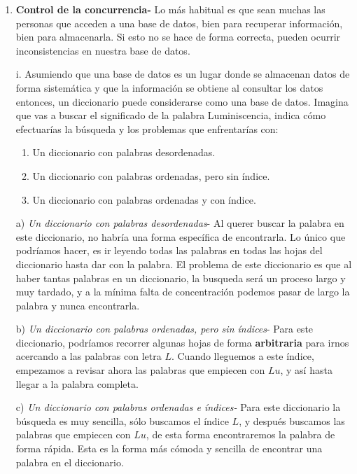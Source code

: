 \documentclass{article}
\begin{document}
\begin{enumerate}
\begin{enumerate}
\item \textbf{Control de la concurrencia- }Lo más habitual es que sean muchas las personas que acceden a una base de datos, bien para recuperar información, bien para almacenarla. Si esto no se hace de forma correcta, pueden ocurrir inconsistencias en nuestra base de datos.
\end{enumerate}    
\begin{itemize}
    \item[i.]Asumiendo que una base de datos es un lugar donde se almacenan datos de forma sistemática y que la información se obtiene al consultar los datos entonces, un diccionario puede considerarse como una base de datos. Imagina que vas a buscar el significado de la palabra Luminiscencia, indica cómo efectuarías la búsqueda y los problemas que enfrentarías con:
    \begin{enumerate}
        \item Un diccionario con palabras desordenadas.
        \item Un diccionario con palabras ordenadas, pero sin índice.
        \item Un diccionario con palabras ordenadas y con índice.
    \end{enumerate}
    \end{itemize}
\begin{itemize}

\item[a)] \textit{Un diccionario con palabras desordenadas}- Al querer buscar la palabra en este diccionario, no habría una forma específica de encontrarla. Lo único que podríamos hacer, es ir leyendo todas las palabras en todas las hojas del diccionario hasta dar con la palabra. El problema de este diccionario es que al haber tantas palabras en un diccionario, la busqueda será un proceso largo y muy tardado, y a la mínima falta de concentración podemos pasar de largo la palabra y nunca encontrarla.\\
\item[b)] \textit{Un diccionario con palabras ordenadas, pero sin índices}- Para este diccionario, podríamos recorrer algunas hojas de forma \textbf{arbitraria} para irnos acercando a las palabras con letra $L$. Cuando lleguemos a este índice, empezamos a revisar ahora las palabras que empiecen con $Lu$, y así hasta llegar a la palabra completa.\\
\item[c)] \textit{Un diccionario con palabras ordenadas e índices-} Para este diccionario la búsqueda es muy sencilla, sólo buscamos el índice $L$, y después buscamos las palabras que empiecen con $Lu$, de esta forma encontraremos la palabra de forma rápida. Esta es la forma más cómoda y sencilla de encontrar una palabra en el diccionario.
\end{itemize}



\end{enumerate}
\end{document}
